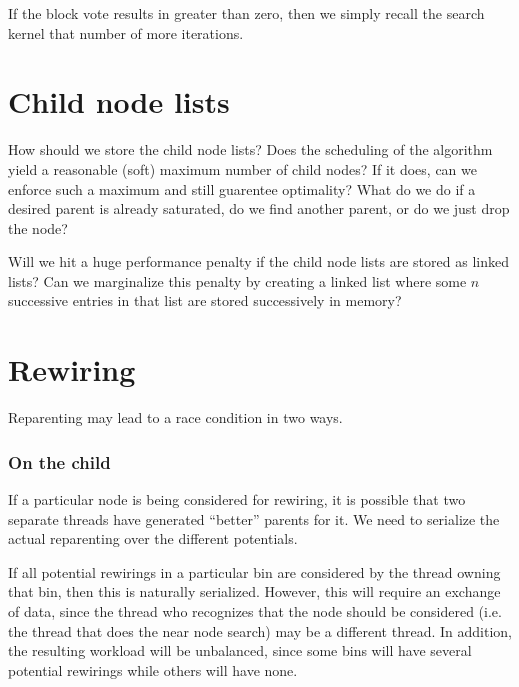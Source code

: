 If the block vote results in greater than zero, then we simply recall the search kernel that number of more iterations.
 



\section{Child node lists}
\label{a:ChildNodeLists}
How should we store the child node lists? Does the scheduling of the algorithm yield a reasonable (soft) maximum number of child nodes? If it does, can we enforce such a maximum and still guarentee optimality? What do we do if a desired parent is already saturated, do we find another parent, or do we just drop the node?

Will we hit a huge performance penalty if the child node lists are stored as linked lists? Can we marginalize this penalty by creating a linked list where some $n$ successive entries in that list are stored successively in memory?

\begin{figure}[H]
\begin{centering}
    \texttt{[image: \\figfile\{fig/child\_list]}}
    \caption{Linked-list of arrays}
\end{centering} 
\end{figure}


\section{Rewiring}

Reparenting may lead to a race condition in two ways. 

\subsubsection{On the child}
If a particular node is being considered for rewiring, it is possible that two separate threads have generated ``better'' parents for it. We need to serialize the actual reparenting over the different potentials. 

If all potential rewirings in a particular bin are considered by the thread owning that bin, then this is naturally serialized. However, this will require an exchange of data, since the thread who recognizes that the node should be considered (i.e. the thread that does the near node search) may be a different thread. In addition, the resulting workload will be unbalanced, since some bins will have several potential rewirings while others will have none.


